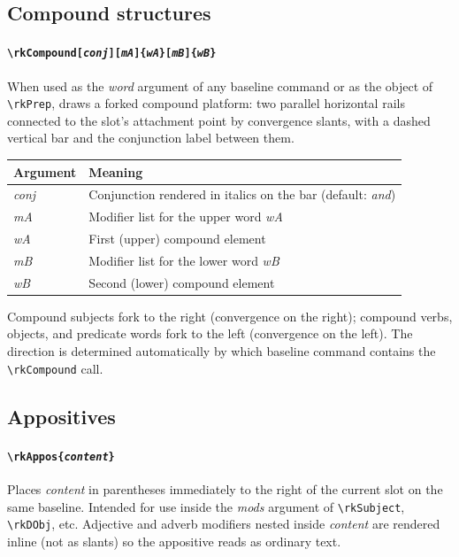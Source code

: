 \documentclass[11pt]{article}
\newcommand{\cmd}[1]{\texttt{\textbackslash #1}}
\begin{document}
\subsection*{Compound structures}

\paragraph{\cmd{rkCompound[\textit{conj}][\textit{mA}]\{\textit{wA}\}[\textit{mB}]\{\textit{wB}\}}}
When used as the \textit{word} argument of any baseline command or as the
object of \cmd{rkPrep}, draws a forked compound platform: two parallel
horizontal rails connected to the slot's attachment point by convergence
slants, with a dashed vertical bar and the conjunction label between them.

\medskip
\begin{tabular}{@{}p{3.5cm}p{11.5cm}@{}}
  \toprule
  Argument & Meaning \\
  \midrule
  \textit{conj} & Conjunction rendered in italics on the bar (default: \emph{and}) \\
  \textit{mA}   & Modifier list for the upper word \textit{wA} \\
  \textit{wA}   & First (upper) compound element \\
  \textit{mB}   & Modifier list for the lower word \textit{wB} \\
  \textit{wB}   & Second (lower) compound element \\
  \bottomrule
\end{tabular}

\medskip\noindent
Compound subjects fork to the right (convergence on the right); compound
verbs, objects, and predicate words fork to the left (convergence on the
left).  The direction is determined automatically by which baseline command
contains the \cmd{rkCompound} call.

\subsection*{Appositives}

\paragraph{\cmd{rkAppos\{\textit{content}\}}}
Places \textit{content} in parentheses immediately to the right of the
current slot on the same baseline.  Intended for use inside the
\textit{mods} argument of \cmd{rkSubject}, \cmd{rkDObj}, etc.
Adjective and adverb modifiers nested inside \textit{content} are rendered
inline (not as slants) so the appositive reads as ordinary text.
\end{document}
